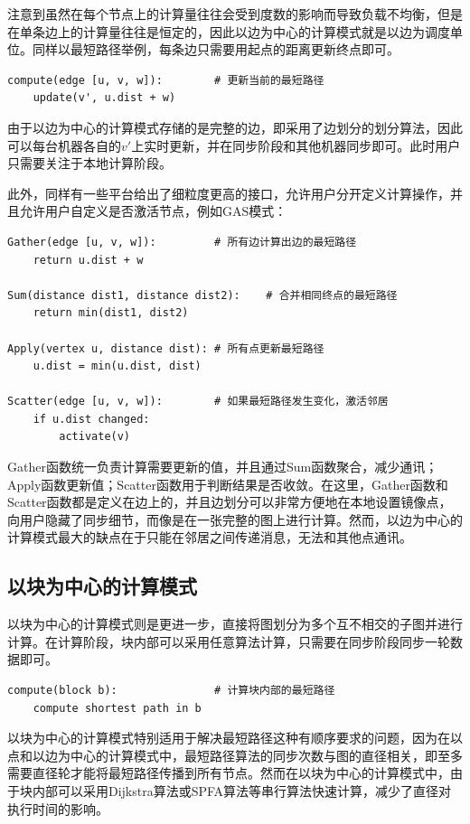 注意到虽然在每个节点上的计算量往往会受到度数的影响而导致负载不均衡，但是在单条边上的计算量往往是恒定的，因此以边为中心的计算模式就是以边为调度单位。同样以最短路径举例，每条边只需要用起点的距离更新终点即可。
\begin{lstlisting}
compute(edge [u, v, w]):        # 更新当前的最短路径
    update(v', u.dist + w)          
\end{lstlisting}
由于以边为中心的计算模式存储的是完整的边，即采用了边划分的划分算法，因此可以每台机器各自的$v'$上实时更新，并在同步阶段和其他机器同步即可。此时用户只需要关注于本地计算阶段。

此外，同样有一些平台给出了细粒度更高的接口，允许用户分开定义计算操作，并且允许用户自定义是否激活节点，例如GAS模式：
\begin{lstlisting}
Gather(edge [u, v, w]):         # 所有边计算出边的最短路径
    return u.dist + w

Sum(distance dist1, distance dist2):    # 合并相同终点的最短路径
    return min(dist1, dist2)

Apply(vertex u, distance dist): # 所有点更新最短路径
    u.dist = min(u.dist, dist)

Scatter(edge [u, v, w]):        # 如果最短路径发生变化，激活邻居
    if u.dist changed:
        activate(v)
\end{lstlisting}
Gather函数统一负责计算需要更新的值，并且通过Sum函数聚合，减少通讯；Apply函数更新值；Scatter函数用于判断结果是否收敛。在这里，Gather函数和Scatter函数都是定义在边上的，并且边划分可以非常方便地在本地设置镜像点，向用户隐藏了同步细节，而像是在一张完整的图上进行计算。然而，以边为中心的计算模式最大的缺点在于只能在邻居之间传递消息，无法和其他点通讯。

\subsection{以块为中心的计算模式}

以块为中心的计算模式则是更进一步，直接将图划分为多个互不相交的子图并进行计算。在计算阶段，块内部可以采用任意算法计算，只需要在同步阶段同步一轮数据即可。
\begin{lstlisting}
compute(block b):               # 计算块内部的最短路径
    compute shortest path in b
\end{lstlisting}

以块为中心的计算模式特别适用于解决最短路径这种有顺序要求的问题，因为在以点和以边为中心的计算模式中，最短路径算法的同步次数与图的直径相关，即至多需要直径轮才能将最短路径传播到所有节点。然而在以块为中心的计算模式中，由于块内部可以采用Dijkstra算法或SPFA算法等串行算法快速计算，减少了直径对执行时间的影响。

